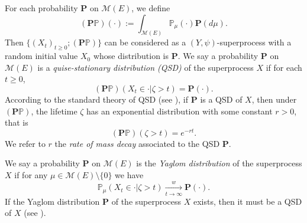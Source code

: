 \documentclass[12pt,a4paper]{amsart}
\numberwithin{equation}{section}
\theoremstyle{plain}
\theoremstyle{definition}
\begin{document}
\begin{comment}
In particular, for any $x,y\in E$ and $s\geq 0$, the second result in the above theorem can be written as
\begin{equation}\label{eq:ratio_result}
 	\lim_{t\rightarrow\infty}\frac{\mathbb P_x(\zeta>t+s)}{\mathbb P_y(\zeta>t)}=\frac{\phi(x)}{\phi(y)}e^{\lambda s}.
\end{equation}
So we can see that the effect of the position of the initial mass on the decay of the mass is a ratio of $\phi(\cdot)$ generally.
\end{comment}
For each probability ${\mathbf P}$ on $\mathcal M(E)$, we define
\[
	( {\mathbf P} \mathbb P)(\cdot) := \int_{\mathcal M(E)} \mathbb P_\mu(\cdot) {\mathbf P}(d\mu).
\]
Then $\{(X_t)_{t\geq 0}; ({\mathbf P}\mathbb P)\}$ can be considered as a $(Y,\psi)$-superprocess with a random initial value $X_0$ whose distribution is ${\mathbf P}$.
We say a probability ${\mathbf P}$ on $\mathcal M(E)$ is a \emph{quise-stationary distribution (QSD)} of the superprocess $X$ if  for each $t\geq 0$,
\[
	({\mathbf P}\mathbb P)(X_t \in \cdot | \zeta > t) ={\mathbf P}(\cdot).
\]
According to the standard theory of QSD (see \cite{MeleardVillemonais2012Quasistationary}), if ${\mathbf P}$ is a QSD of $X$, then under $({\mathbf P}\mathbb P)$, the lifetime $\zeta$ has an exponential distribution with some constant $r > 0$, that is
\[
	( {\mathbf P}\mathbb P)(\zeta > t) = e^{-r t}.
\]
We refer to $r$ the \emph{rate of mass decay} associated to the QSD $\mathbf P$.

We say a probability ${\mathbf P}$ on $\mathcal M(E)$ is the \emph{Yaglom distribution} of the superprocess $X$ if for any $\mu\in \mathcal M(E)\setminus\{0\}$ we have
\[
	\mathbb P_\mu(X_t \in \cdot | \zeta > t) \xrightarrow[t\to \infty]{w} {\mathbf P}(\cdot).
\]
If the Yaglom distribution ${\mathbf P}$ of the superprocess $X$ exists, then it must be a QSD of $X$ (see \cite{MeleardVillemonais2012Quasistationary}).
\end{document}
